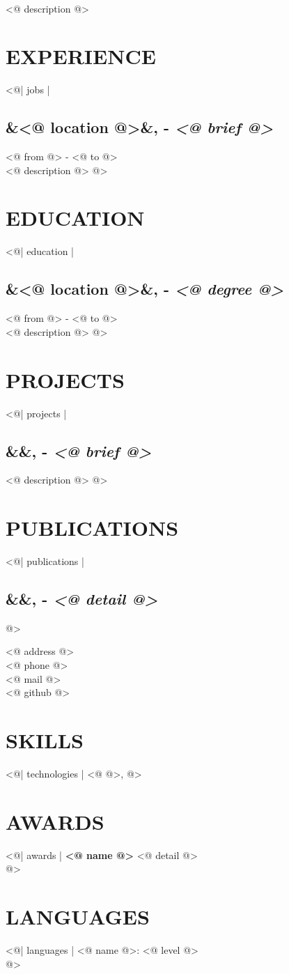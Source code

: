 \documentclass[a4paper,10pt]{scrartcl}
\newcommand{\name}[1]{{\textbf{{\fontsize{30}{30}\selectfont #1}}}}
\newcommand{\heading}[1]{\section*{{\large \uppercase{\textbf{#1}}}}}
\newcommand{\subheading}[3]{\subsection*{{\large #1\textnormal{\ifx&#2&\else, \fi #2 - \textit{#3}}}}}
\newcommand{\timeperiod}[1]{{\small \textcolor{dark}{#1}}\\[3pt]}
\begin{document}
\begin{paracol}{2}

\name{<@ name @>}\\
<@ description @>

\heading{Experience}
<@| jobs |
    \subheading{<@ company @>}{<@ location @>}{<@ brief @>}
    \timeperiod{<@ from @> - <@ to @>}
    <@ description @>
@>

\heading{Education}
<@| education |
    \subheading{<@ name@>}{<@ location @>}{<@ degree @>}
    \timeperiod{<@ from @> - <@ to @>}
    <@ description @>
@>

\heading{Projects}
<@| projects |
    \subheading{<@ name@>}{}{<@ brief @>}
    <@ description @>
@>

\heading{Publications}
<@| publications |
    \subheading{<@ name@>}{}{<@ detail @>}
@>

\switchcolumn
\raggedright

<@ address @>\\
<@ phone @>\\
<@ mail @>\\
<@ github @>\\

\heading{Skills}
<@| technologies | {<@ @>}, @>
\\

\heading{Awards}
<@| awards |
    \textbf{<@ name @>} <@ detail @>
    \\[5pt]
@>
\heading{Languages}
<@| languages |
    <@ name @>: <@ level @>
    \\
@>

\end{paracol}
\end{document}
